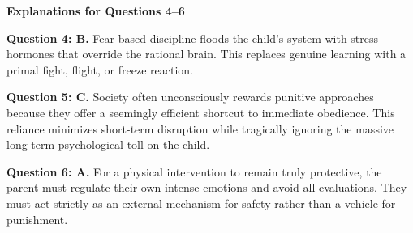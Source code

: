 \begin{practiceexercise}
\newpage
\textbf{Explanations for Questions 4--6}

\textbf{Question 4: B.} Fear-based discipline floods the child's system with stress hormones that override the rational brain.
This replaces genuine learning with a primal fight, flight, or freeze reaction.
\vspace{\fill}

\textbf{Question 5: C.} Society often unconsciously rewards punitive approaches because they offer a seemingly efficient shortcut to immediate obedience.
This reliance minimizes short-term disruption while tragically ignoring the massive long-term psychological toll on the child.
\vspace{\fill}

\textbf{Question 6: A.} For a physical intervention to remain truly protective, the parent must regulate their own intense emotions and avoid all evaluations.
They must act strictly as an external mechanism for safety rather than a vehicle for punishment.
\vspace{\fill}
\newpage


\end{practiceexercise}
